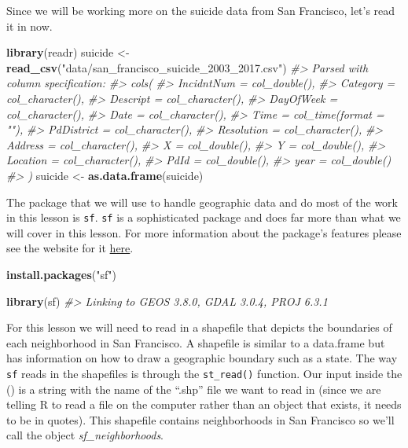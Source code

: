 \documentclass[
  12pt,
]{book}
\newenvironment{Shaded}{\begin{snugshade}}{\end{snugshade}}
\newcommand{\CommentTok}[1]{\textcolor[rgb]{0.56,0.35,0.01}{\textit{#1}}}
\newcommand{\KeywordTok}[1]{\textcolor[rgb]{0.13,0.29,0.53}{\textbf{#1}}}
\newcommand{\NormalTok}[1]{#1}
\newcommand{\StringTok}[1]{\textcolor[rgb]{0.31,0.60,0.02}{#1}}
\begin{document}
Since we will be working more on the suicide data from San Francisco, let's read it in now.

\begin{Shaded}
\begin{Highlighting}[]
\KeywordTok{library}\NormalTok{(readr)}
\NormalTok{suicide <{-}}\StringTok{ }\KeywordTok{read\_csv}\NormalTok{(}\StringTok{"data/san\_francisco\_suicide\_2003\_2017.csv"}\NormalTok{)}
\CommentTok{\#> Parsed with column specification:}
\CommentTok{\#> cols(}
\CommentTok{\#>   IncidntNum = col\_double(),}
\CommentTok{\#>   Category = col\_character(),}
\CommentTok{\#>   Descript = col\_character(),}
\CommentTok{\#>   DayOfWeek = col\_character(),}
\CommentTok{\#>   Date = col\_character(),}
\CommentTok{\#>   Time = col\_time(format = ""),}
\CommentTok{\#>   PdDistrict = col\_character(),}
\CommentTok{\#>   Resolution = col\_character(),}
\CommentTok{\#>   Address = col\_character(),}
\CommentTok{\#>   X = col\_double(),}
\CommentTok{\#>   Y = col\_double(),}
\CommentTok{\#>   Location = col\_character(),}
\CommentTok{\#>   PdId = col\_double(),}
\CommentTok{\#>   year = col\_double()}
\CommentTok{\#> )}
\NormalTok{suicide <{-}}\StringTok{ }\KeywordTok{as.data.frame}\NormalTok{(suicide)}
\end{Highlighting}
\end{Shaded}

The package that we will use to handle geographic data and do most of the work in this lesson is \texttt{sf}. \texttt{sf} is a sophisticated package and does far more than what we will cover in this lesson. For more information about the package's features please see the website for it \href{http://r-spatial.github.io/sf/}{here}.

\begin{Shaded}
\begin{Highlighting}[]
\KeywordTok{install.packages}\NormalTok{(}\StringTok{"sf"}\NormalTok{)}
\end{Highlighting}
\end{Shaded}

\begin{Shaded}
\begin{Highlighting}[]
\KeywordTok{library}\NormalTok{(sf)}
\CommentTok{\#> Linking to GEOS 3.8.0, GDAL 3.0.4, PROJ 6.3.1}
\end{Highlighting}
\end{Shaded}

For this lesson we will need to read in a shapefile that depicts the boundaries of each neighborhood in San Francisco. A shapefile is similar to a data.frame but has information on how to draw a geographic boundary such as a state. The way \texttt{sf} reads in the shapefiles is through the \texttt{st\_read()} function. Our input inside the () is a string with the name of the ``.shp'' file we want to read in (since we are telling R to read a file on the computer rather than an object that exists, it needs to be in quotes). This shapefile contains neighborhoods in San Francisco so we'll call the object \emph{sf\_neighborhoods}.
\end{document}
